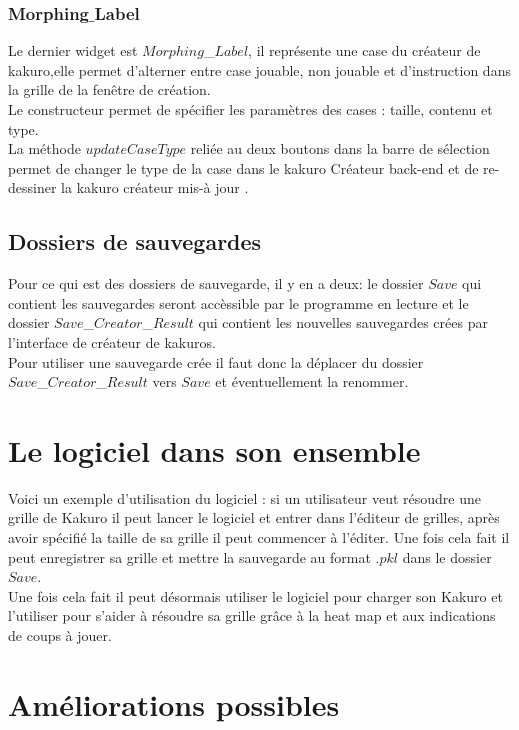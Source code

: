 \documentclass[french,12pt]{article}
\begin{document}
\subsubsection{Morphing$\_$Label}

Le dernier widget est $Morphing$\_$Label$, il représente une case du créateur de kakuro,elle permet d'alterner entre case jouable, non jouable et d'instruction dans la grille de la fenêtre de création. \\
Le constructeur permet de spécifier les paramètres des cases : taille, contenu et type.  \\
La méthode $updateCaseType$ reliée au deux boutons dans la barre de sélection  permet de changer le type de la case dans le kakuro Créateur back-end et de re-dessiner la kakuro créateur mis-à jour .

\subsection{Dossiers de sauvegardes}

Pour ce qui est des dossiers de sauvegarde, il y en a deux:  le dossier $Save$ qui contient les sauvegardes seront accèssible par le programme en lecture et le dossier $Save$\_$Creator$\_$Result$ qui contient les nouvelles sauvegardes crées par l'interface de créateur de kakuros. \\
Pour utiliser une sauvegarde crée il faut donc la déplacer du dossier \\ $Save$\_$Creator$\_$Result$ vers $Save$ et éventuellement la renommer.

\section{Le logiciel dans son ensemble}

Voici un exemple d'utilisation du logiciel : si un utilisateur veut résoudre une grille de Kakuro il peut lancer le logiciel et entrer dans l'éditeur de grilles, après avoir spécifié la taille de sa grille il peut commencer à l'éditer. Une fois cela fait il peut enregistrer sa grille et mettre la sauvegarde au format $.pkl$ dans le dossier $Save$. \\ Une fois cela fait il peut désormais utiliser le logiciel pour charger son Kakuro et l'utiliser pour s'aider à résoudre sa grille grâce à la heat map et aux indications de coups à jouer. 

\section{Améliorations possibles}
\end{document}
